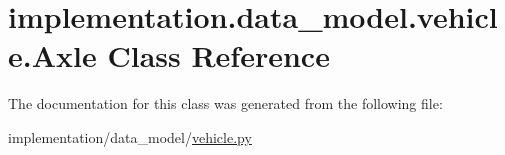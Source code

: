 \hypertarget{classimplementation_1_1data__model_1_1vehicle_1_1_axle}{}\section{implementation.\+data\+\_\+model.\+vehicle.\+Axle Class Reference}
\label{classimplementation_1_1data__model_1_1vehicle_1_1_axle}


The documentation for this class was generated from the following file\+:\begin{DoxyCompactItemize}
\item 
implementation/data\+\_\+model/\hyperlink{vehicle_8py}{vehicle.\+py}\end{DoxyCompactItemize}
